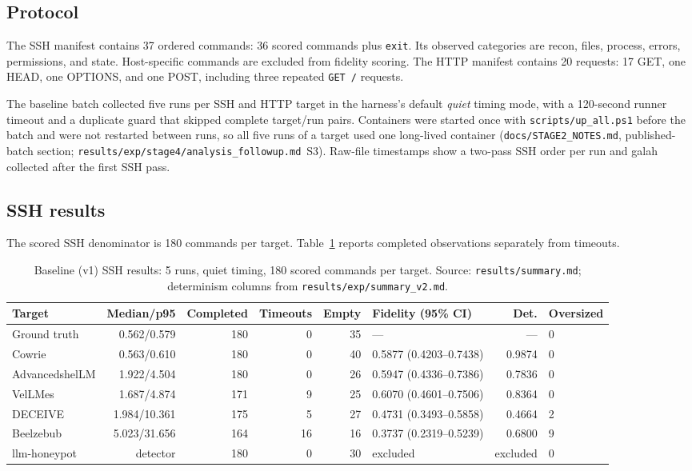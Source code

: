 \documentclass[a4paper,11pt]{article}
\begin{document}
\subsection{Protocol}

The SSH manifest contains 37 ordered commands: 36 scored commands plus
\texttt{exit}. Its observed categories are recon, files, process, errors,
permissions, and state. Host-specific commands are excluded from fidelity
scoring. The HTTP manifest contains 20 requests: 17 GET, one HEAD, one
OPTIONS, and one POST, including three repeated \texttt{GET /} requests.

The baseline batch collected five runs per SSH and HTTP target in the
harness's default \emph{quiet} timing mode, with a 120-second runner timeout
and a duplicate guard that skipped complete target/run pairs. Containers were
started once with \texttt{scripts/up\_all.ps1} before the batch and were not
restarted between runs, so all five runs of a target used one long-lived
container (\texttt{docs/STAGE2\_NOTES.md}, published-batch section;
\texttt{results/exp/stage4/analysis\_followup.md}~S3). Raw-file timestamps show
a two-pass SSH order per run and galah collected after the first SSH pass.

\subsection{SSH results}

The scored SSH denominator is 180 commands per target.
Table~\ref{tab:v1-ssh} reports completed observations separately from
timeouts.

\begin{table}[ht]
\centering
\caption{Baseline (v1) SSH results: 5 runs, quiet timing, 180 scored commands
per target. Source: \texttt{results/summary.md}; determinism columns from
\texttt{results/exp/summary\_v2.md}.}
\label{tab:v1-ssh}
\scriptsize
\begin{tabularx}{\textwidth}{l r r r r l r l}
\toprule
Target & Median/p95 & Comple\-ted & Time\-outs & Empty & Fidelity (95\% CI) & Det. & Oversized \\
\midrule
Ground truth & 0.562/0.579 & 180 & 0 & 35 & --- & --- & 0 \\
Cowrie & 0.563/0.610 & 180 & 0 & 40 & 0.5877 (0.4203--0.7438) & 0.9874 & 0 \\
AdvancedshelLM & 1.922/4.504 & 180 & 0 & 26 & 0.5947 (0.4336--0.7386) & 0.7836 & 0 \\
VelLMes & 1.687/4.874 & 171 & 9 & 25 & 0.6070 (0.4601--0.7506) & 0.8364 & 0 \\
DECEIVE & 1.984/10.361 & 175 & 5 & 27 & 0.4731 (0.3493--0.5858) & 0.4664 & 2 \\
Beelzebub & 5.023/31.656 & 164 & 16 & 16 & 0.3737 (0.2319--0.5239) & 0.6800 & 9 \\
llm-honeypot & detector & 180 & 0 & 30 & excluded & excluded & 0 \\
\bottomrule
\end{tabularx}
\end{table}
\end{document}
